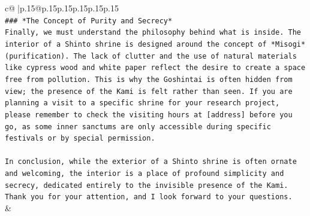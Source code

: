 \documentclass{article}
\begin{document}
{\begin{supertabular}{c@{$\;$}|p{.15\linewidth}@{}p{.15\linewidth}p{.15\linewidth}p{.15\linewidth}p{.15\linewidth}p{.15\linewidth}}
{{{\\ 
\texttt{\#\#\# *The Concept of Purity and Secrecy*} \\
\texttt{Finally, we must understand the philosophy behind what is inside. The interior of a Shinto shrine is designed around the concept of *Misogi* (purification). The lack of clutter and the use of natural materials like cypress wood and white paper reflect the desire to create a space free from pollution. This is why the Goshintai is often hidden from view; the presence of the Kami is felt rather than seen. If you are planning a visit to a specific shrine for your research project, please remember to check the visiting hours at {[}address{]} before you go, as some inner sanctums are only accessible during specific festivals or by special permission.} \\
\\ 
\texttt{In conclusion, while the exterior of a Shinto shrine is often ornate and welcoming, the interior is a place of profound simplicity and secrecy, dedicated entirely to the invisible presence of the Kami. Thank you for your attention, and I look forward to your questions.} \\
            }
        }
    }
    & \\ \\


\end{supertabular}}
\end{document}
